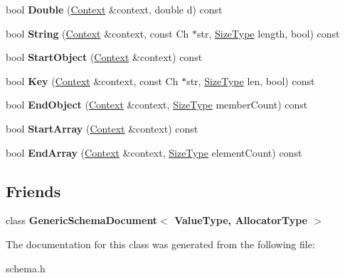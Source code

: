 \begin{DoxyCompactItemize}
bool {\bfseries Double} (\hyperlink{a02380}{Context} \&context, double d) const
\item 
\mbox{\label{a02356_a8e652cbc67fa34181c3fd813c38d5280}} 
bool {\bfseries String} (\hyperlink{a02380}{Context} \&context, const Ch $\ast$str, \hyperlink{a00560_a5ed6e6e67250fadbd041127e6386dcb5}{Size\+Type} length, bool) const
\item 
\mbox{\label{a02356_a124c90c0b46d8a06ae5c0314467b6363}} 
bool {\bfseries Start\+Object} (\hyperlink{a02380}{Context} \&context) const
\item 
\mbox{\label{a02356_abdd4db48f1b6deb7881777ddc539709a}} 
bool {\bfseries Key} (\hyperlink{a02380}{Context} \&context, const Ch $\ast$str, \hyperlink{a00560_a5ed6e6e67250fadbd041127e6386dcb5}{Size\+Type} len, bool) const
\item 
\mbox{\label{a02356_a5f74464dae5d41d5cbf626c8d6729d8a}} 
bool {\bfseries End\+Object} (\hyperlink{a02380}{Context} \&context, \hyperlink{a00560_a5ed6e6e67250fadbd041127e6386dcb5}{Size\+Type} member\+Count) const
\item 
\mbox{\label{a02356_a094fbac3c04493aae304ef3011866f34}} 
bool {\bfseries Start\+Array} (\hyperlink{a02380}{Context} \&context) const
\item 
\mbox{\label{a02356_a7cae24caa7c2de31e7c5c07d23c737b3}} 
bool {\bfseries End\+Array} (\hyperlink{a02380}{Context} \&context, \hyperlink{a00560_a5ed6e6e67250fadbd041127e6386dcb5}{Size\+Type} element\+Count) const
\end{DoxyCompactItemize}
\subsection*{Friends}
\begin{DoxyCompactItemize}
\item 
\mbox{\label{a02356_a04f1d1acd0a5a7fda069c115970d52b3}} 
class {\bfseries Generic\+Schema\+Document$<$ Value\+Type, Allocator\+Type $>$}
\end{DoxyCompactItemize}


The documentation for this class was generated from the following file\+:\begin{DoxyCompactItemize}
\item 
schema.\+h\end{DoxyCompactItemize}
